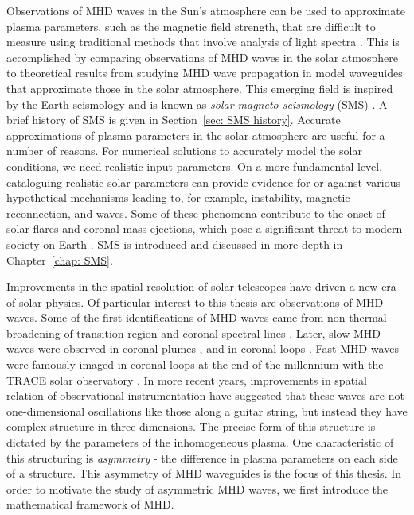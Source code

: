 Observations of MHD waves in the Sun's atmosphere can be used to approximate plasma parameters, such as the magnetic field strength, that are difficult to measure using traditional methods that involve analysis of light spectra \citep{nak_etal05,dem_etal12}. This is accomplished by comparing observations of MHD waves in the solar atmosphere to theoretical results from studying MHD wave propagation in model waveguides that approximate those in the solar atmosphere. This emerging field is inspired by the Earth seismology and is known as \textit{solar magneto-seismology} (SMS) \citep{erd06}. A brief history of SMS is given in Section~\ref{sec: SMS history}. Accurate approximations of plasma parameters in the solar atmosphere are useful for a number of reasons. For numerical solutions to accurately model the solar conditions, we need realistic input parameters. On a more fundamental level, cataloguing realistic solar parameters can provide evidence for or against various hypothetical mechanisms leading to, for example, instability, magnetic reconnection, and waves. Some of these phenomena contribute to the onset of solar flares and coronal mass ejections, which pose a significant threat to modern society on Earth \citep{cab15}. SMS is introduced and discussed in more depth in Chapter~\ref{chap: SMS}.

Improvements in the spatial-resolution of solar telescopes have driven a new era of solar physics. Of particular interest to this thesis are observations of MHD waves. Some of the first identifications of MHD waves came from non-thermal broadening of transition region and coronal spectral lines \citep{dos_etal76,zir93}. Later, slow MHD waves were observed in coronal plumes \citep{def_etal98,ofm_etal99,ofm_etal00}, and in coronal loops \citep{nak_etal00, rob_etal01}. Fast MHD waves were famously imaged in coronal loops at the end of the millennium with the TRACE solar observatory \citep{asc_etal99, nak_etal99}. In more recent years, improvements in spatial relation of observational instrumentation have suggested that these waves are not one-dimensional oscillations like those along a guitar string, but instead they have complex structure in three-dimensions. The precise form of this structure is dictated by the parameters of the inhomogeneous plasma. One characteristic of this structuring is \textit{asymmetry} - the difference in plasma parameters on each side of a structure. This asymmetry of MHD waveguides is the focus of this thesis. In order to motivate the study of asymmetric MHD waves, we first introduce the mathematical framework of MHD.


